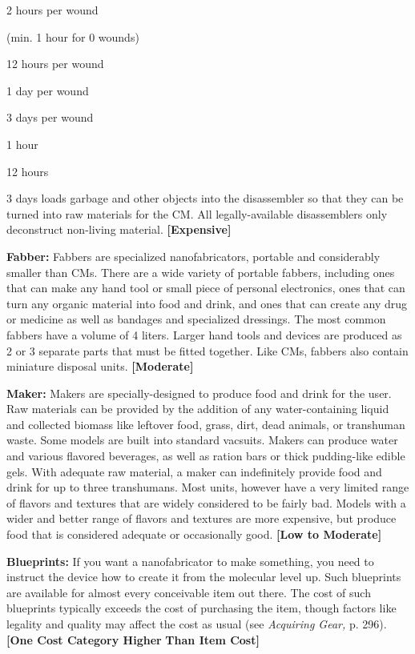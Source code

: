 2 hours per wound 

(min. 1 hour for 0 wounds)

12 hours per wound

1 day per wound

3 days per wound

1 hour

12 hours

3 days
loads garbage and other objects into the disassembler 
so that they can be turned into raw materials for the 
CM. All legally-available disassemblers only deconstruct
non-living material. \textbf{[Expensive]}

\textbf{Fabber:} Fabbers are specialized nanofabricators, 
portable and considerably smaller than CMs. There 
are a wide variety of portable fabbers, including 
ones that can make any hand tool or small piece of 
personal electronics, ones that can turn any organic 
material into food and drink, and ones that can create 
any drug or medicine as well as bandages and specialized
dressings. The most common fabbers have a
volume of 4 liters. Larger hand tools and devices are 
produced as 2 or 3 separate parts that must be fitted 
together. Like CMs, fabbers also contain miniature 
disposal units. \textbf{[Moderate]}

\textbf{Maker:} Makers are specially-designed to produce 
food and drink for the user. Raw materials can be provided
by the addition of any water-containing liquid
and collected biomass like leftover food, grass, dirt, 
dead animals, or transhuman waste. Some models are 
built into standard vacsuits. Makers can produce water 
and various flavored beverages, as well as ration bars 
or thick pudding-like edible gels. With adequate raw 
material, a maker can indefinitely provide food and 
drink for up to three transhumans. Most units, however
have a very limited range of flavors and textures
that are widely considered to be fairly bad. Models 
with a wider and better range of flavors and textures 
are more expensive, but produce food that is considered
adequate or occasionally good. \textbf{[Low to Moderate]}

\textbf{Blueprints:} If you want a nanofabricator to make 
something, you need to instruct the device how to 
create it from the molecular level up. Such blueprints 
are available for almost every conceivable item out 
there. The cost of such blueprints typically exceeds 
the cost of purchasing the item, though factors like 
legality and quality may affect the cost as usual (see 
\textit{Acquiring Gear,} p. 296). \textbf{[One Cost Category Higher }
\textbf{Than Item Cost]}

